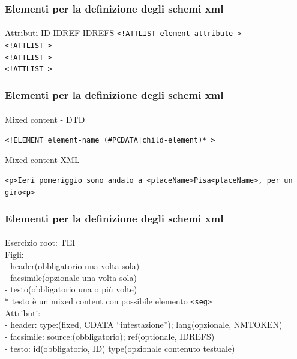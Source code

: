 \begin{frame}
    \frametitle{Elementi per la definizione degli schemi xml}
    \framesubtitle{}
    \addtocounter{nframe}{1}

    \begin{block}{Attributi ID IDREF IDREFS}
     \texttt{<!ATTLIST element attribute  >}
    \\\texttt{<!ATTLIST >}
    \\\texttt{<!ATTLIST >}
    \\\texttt{<!ATTLIST >}
    \end{block}
\end{frame}

\begin{frame}
    \frametitle{Elementi per la definizione degli schemi xml}
    \framesubtitle{}
    \addtocounter{nframe}{1}

    \begin{block}{Mixed content - DTD}
    \begin{center}\texttt{<!ELEMENT element-name (\#PCDATA|child-element)* >}\end{center}
    \end{block}

    \begin{block}{Mixed content XML}
    \begin{center}\texttt{<p>Ieri pomeriggio sono andato a <placeName>Pisa<placeName>, per un giro<p>}\end{center}
    \end{block}

\end{frame}


\begin{frame}
    \frametitle{Elementi per la definizione degli schemi xml}
    \framesubtitle{}
    \addtocounter{nframe}{1}

    \begin{block}{Esercizio}
        root: TEI
         \\Figli: 
         \\- header(obbligatorio una volta sola) 
         \\- facsimile(opzionale una volta sola) 
         \\- testo(obbligatorio una o più volte)
         \\ * testo è un mixed content con possibile elemento \texttt{<seg>} 
         \\Attributi: 
         \\- header: type:(fixed, CDATA ``intestazione''); lang(opzionale, NMTOKEN)
         \\- facsimile: source:(obbligatorio); ref(optionale, IDREFS)
         \\- testo: id(obbligatorio, ID) type(opzionale contenuto testuale)
    \end{block}
\end{frame}

